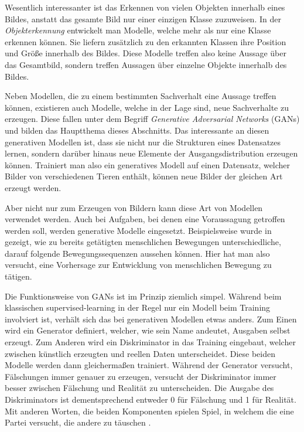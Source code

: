 \documentclass{hsflensburg}
\begin{document}
  Wesentlich interessanter ist das Erkennen von vielen Objekten innerhalb eines
  Bildes, anstatt das gesamte Bild nur einer einzigen Klasse zuzuweisen. In der
  \textit{Objekterkennung} entwickelt man Modelle, welche mehr als nur eine
  Klasse erkennen können. Sie liefern zusätzlich zu den erkannten Klassen ihre
  Position und Größe innerhalb des Bildes. Diese Modelle treffen also keine
  Aussage über das Gesamtbild, sondern treffen Aussagen über einzelne Objekte
  innerhalb des Bildes.

  Neben Modellen, die zu einem bestimmten Sachverhalt eine Aussage treffen
  können, existieren auch Modelle, welche in der Lage sind, neue Sachverhalte zu
  erzeugen. Diese fallen unter dem Begriff \textit{Generative Adversarial
  Networks} (GANs) und bilden das Hauptthema dieses Abschnitts. Das interessante
  an diesen generativen Modellen ist, dass sie nicht nur die Strukturen eines
  Datensatzes lernen, sondern darüber hinaus neue Elemente der
  Ausgangsdistribution erzeugen können. Trainiert man also ein generatives
  Modell auf einen Datensatz, welcher Bilder von verschiedenen Tieren enthält,
  können neue Bilder der gleichen Art erzeugt werden.
  
  Aber nicht nur zum Erzeugen von Bildern kann diese Art von Modellen verwendet
  werden. Auch bei Aufgaben, bei denen eine Voraussagung getroffen werden soll,
  werden generative Modelle eingesetzt. Beispielsweise wurde in
  \cite{barsoum2017hpgan} gezeigt, wie zu bereits getätigten menschlichen
  Bewegungen unterschiedliche, darauf folgende Bewegungssequenzen aussehen
  können. Hier hat man also versucht, eine Vorhersage zur Entwicklung von
  menschlichen Bewegung zu tätigen.

  Die Funktionsweise von GANs ist im Prinzip ziemlich simpel. Während beim
  klassischen supervised-learning in der Regel nur ein Modell beim Training
  involviert ist, verhält sich das bei generativen Modellen etwas anders. Zum
  Einen wird ein Generator definiert, welcher, wie sein Name andeutet, Ausgaben
  selbst erzeugt. Zum Anderen wird ein Diskriminator in das Training eingebaut,
  welcher zwischen künstlich erzeugten und reellen Daten unterscheidet. Diese
  beiden Modelle werden dann gleichermaßen trainiert. Während der Generator
  versucht, Fälschungen immer genauer zu erzeugen, versucht der Diskriminator
  immer besser zwischen Fälschung und Realität zu unterscheiden. Die
  Ausgabe des Diskriminators ist dementsprechend entweder 0 für Fälschung und 1
  für Realität. Mit anderen Worten, die beiden Komponenten spielen Spiel, in
  welchem die eine Partei versucht, die andere zu täuschen
  \cite{goodfellow2014generative}.
\end{document}
